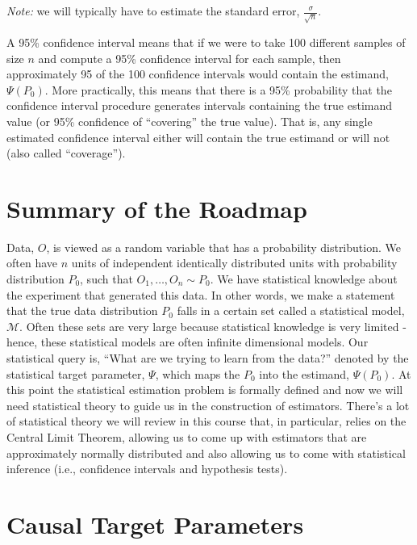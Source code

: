 \documentclass[12pt, krantz2,]{krantz}
\theoremstyle{definition}
\theoremstyle{definition}
\theoremstyle{definition}
\newcommand{\M}{\mathcal{M}}
\newcommand{\1}{\mathbbm{1}}
\begin{document}
\emph{Note:} we will typically have to estimate the standard error,
\(\frac{\sigma}{\sqrt{n}}\).

A 95\% confidence interval means that if we were to take 100 different samples
of size \(n\) and compute a 95\% confidence interval for each sample, then
approximately 95 of the 100 confidence intervals would contain the estimand,
\(\Psi(P_0)\). More practically, this means that there is a 95\% probability
that the confidence interval procedure generates intervals containing the
true estimand value (or 95\% confidence of ``covering'' the true value). That is,
any single estimated confidence interval either will contain the true estimand
or will not (also called ``coverage'').

\hypertarget{roadmap-summary}{%
\section{Summary of the Roadmap}\label{roadmap-summary}}

Data, \(O\), is viewed as a random variable that has a probability distribution.
We often have \(n\) units of independent identically distributed units with
probability distribution \(P_0\), such that \(O_1, \ldots, O_n \sim P_0\). We have
statistical knowledge about the experiment that generated this data. In other
words, we make a statement that the true data distribution \(P_0\) falls in a
certain set called a statistical model, \(\M\). Often these sets are very large
because statistical knowledge is very limited - hence, these statistical models
are often infinite dimensional models. Our statistical query is, ``What are we
trying to learn from the data?'' denoted by the statistical target parameter,
\(\Psi\), which maps the \(P_0\) into the estimand, \(\Psi(P_0)\). At this point the
statistical estimation problem is formally defined and now we will need
statistical theory to guide us in the construction of estimators. There's a lot
of statistical theory we will review in this course that, in particular, relies
on the Central Limit Theorem, allowing us to come up with estimators that are
approximately normally distributed and also allowing us to come with statistical
inference (i.e., confidence intervals and hypothesis tests).

\hypertarget{causal}{%
\section{Causal Target Parameters}\label{causal}}
\end{document}

